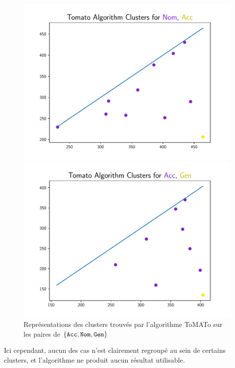 \documentclass{cours}
\begin{document}
\begin{figure}[H]
\begin{minipage}{.5\textwidth}
	\includegraphics[width=\linewidth]{Figures/Visualisations/tomato_Nom_Acc_Nouns}
\end{minipage}
\begin{minipage}{.5\textwidth}
	\includegraphics[width=\linewidth]{Figures/Visualisations/tomato_Acc_Gen_Nouns}
\end{minipage}

\caption{Représentations des clusters trouvés par l'algorithme ToMATo sur les paires de $\{\tt Acc,Nom,Gen\}$}
\end{figure}

Ici cependant, aucun des cas n'est clairement regroupé au sein de certains clusters, et l'algorithme ne produit aucun résultat utilisable.
\end{document}
